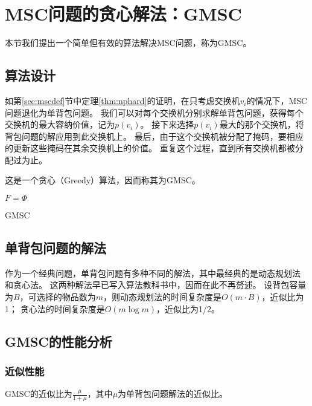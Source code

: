 \section{MSC问题的贪心解法：GMSC}\label{sec:gmscsec}
本节我们提出一个简单但有效的算法解决MSC问题，称为GMSC。



\subsection{算法设计}\label{sec:gmsc}
如第\ref{sec:mscdef}节中定理\ref{thm:nphard}的证明，在只考虑交换机$v_i$的情况下，MSC问题退化为单背包问题。
我们可以对每个交换机分别求解单背包问题，获得每个交换机的最大容纳价值，记为$p(v_i)$。
接下来选择$p(v_i)$最大的那个交换机，将背包问题的解应用到此交换机上。
最后，由于这个交换机被分配了掩码，要相应的更新这些掩码在其余交换机上的价值。
重复这个过程，直到所有交换机都被分配过为止。

这是一个贪心（Greedy）算法，因而称其为GMSC。
\begin{algorithm}[htb]
    \small
    \SetAlgoLined
    $F=\Phi$\;
    \caption{GMSC}
    \label{alg:gmsc}
\end{algorithm}

\subsection{单背包问题的解法}
作为一个经典问题，单背包问题有多种不同的解法，其中最经典的是动态规划法 \cite{martello1999dynamic}和贪心法\cite{cmulec10}。
这两种解法早已写入算法教科书中，因而在此不再赘述。
设背包容量为$B$，可选择的物品数为$m$，则动态规划法的时间复杂度是$O(m\cdot B)$，近似比为1；
贪心法的时间复杂度是$O(m \log{m})$，近似比为1/2。

\subsection{GMSC的性能分析}
\subsubsection{近似性能}
\begin{theorem}\label{tm:gmscappr}
    GMSC的近似比为$\frac{\mu}{1+\mu}$，其中$\mu$为单背包问题解法的近似比。
\end{theorem}

